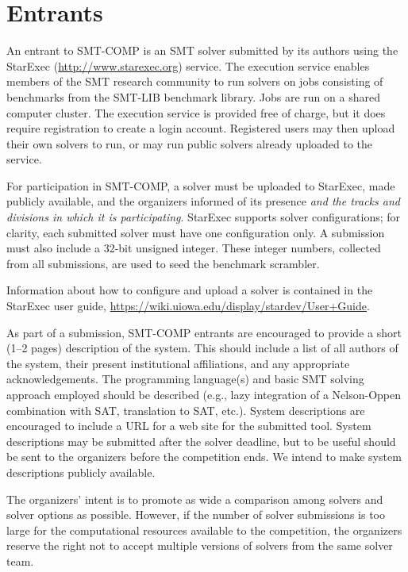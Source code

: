 \documentclass[12pt]{article}
\begin{document}

\section{Entrants}
\label{sec:entrants}

%
An entrant to SMT-COMP is an SMT solver submitted by its authors using
the StarExec (\url{http://www.starexec.org}) service.  The execution
service enables members of the SMT research community to run solvers
on jobs consisting of benchmarks from the SMT-LIB benchmark library.
Jobs are run on a shared computer cluster.  The execution service is
provided free of charge, but it does require registration to create a
login account.  Registered users may then upload their own solvers to
run, or may run public solvers already uploaded to the service.

For participation in SMT-COMP, a solver must be uploaded to StarExec,
made publicly available, and the organizers informed of its presence
{\em and the tracks and divisions in which it is
  participating}. StarExec supports solver configurations; for
clarity, each submitted solver must have one configuration only.  A
submission must also include a 32-bit unsigned integer.  These integer
numbers, collected from all submissions, are used to seed the
benchmark scrambler.

Information about how to configure and upload a solver is contained in
the StarExec user guide,
\url{https://wiki.uiowa.edu/display/stardev/User+Guide}.

%
As part of a submission, SMT-COMP entrants are encouraged to provide a
short (1--2 pages) description of the system.  This should include a
list of all authors of the system, their present institutional
affiliations, and any appropriate acknowledgements.  The programming
language(s) and basic SMT solving approach employed should be
described (e.g., lazy integration of a Nelson-Oppen combination with
SAT, translation to SAT, etc.).  System descriptions are encouraged to
include a URL for a web site for the submitted tool.  System
descriptions may be submitted after the solver deadline, but to be
useful should be sent to the organizers before the competition ends.
We intend to make system descriptions publicly available.

%
The organizers' intent is to promote as wide a comparison among
solvers and solver options as possible.  However, if the number of
solver submissions is too large for the computational resources
available to the competition, the organizers reserve the right not to
accept multiple versions of solvers from the same solver team.
\end{document}
